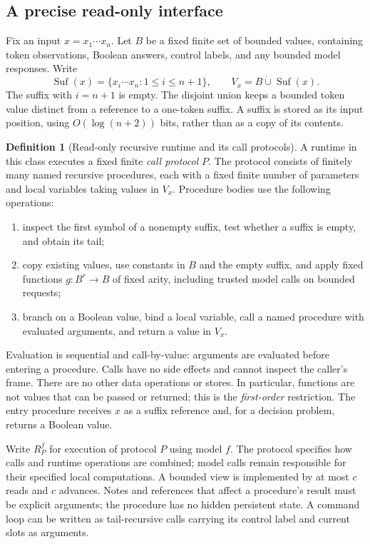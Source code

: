 \documentclass[11pt,twoside]{article}
\theoremstyle{definition}
\newtheorem{definition}[theorem]{Definition}
\theoremstyle{remark}
\begin{document}
\subsection{A precise read-only interface}

Fix an input $x=x_1\cdots x_n$. Let $B$ be a fixed finite set of bounded
values, containing token observations, Boolean answers, control labels,
and any bounded model responses. Write
\begin{equation}
 \operatorname{Suf}(x)=\{x_i\cdots x_n:1\leq i\leq n+1\},
 \qquad V_x=B\mathbin{\dot\cup}\operatorname{Suf}(x).
 \label{eq:readonly-values}
\end{equation}
The suffix with $i=n+1$ is empty. The disjoint union keeps a bounded token
value distinct from a reference to a one-token suffix. A suffix is stored
as its input position, using $O(\log(n+2))$ bits, rather than as a copy of
its contents.

\begin{definition}[Read-only recursive runtime and its call protocols]
\label{def:readonly}
A runtime in this class executes a fixed finite \emph{call protocol} $P$.
The protocol consists of finitely many named recursive procedures, each
with a fixed finite number of parameters and local variables taking values
in $V_x$. Procedure bodies use the following operations:
\begin{enumerate}[label=(\roman*),leftmargin=*]
\item inspect the first symbol of a nonempty suffix, test whether a suffix
is empty, and obtain its tail;
\item copy existing values, use constants in $B$ and the empty suffix,
and apply fixed functions $g:B^r\to B$ of fixed arity, including trusted
model calls on bounded requests;
\item branch on a Boolean value, bind a local variable, call a named
procedure with evaluated arguments, and return a value in $V_x$.
\end{enumerate}
Evaluation is sequential and call-by-value: arguments are evaluated before
entering a procedure. Calls have no side effects and cannot inspect the
caller's frame. There are no other data operations or stores. In particular,
functions are not values that can be passed or returned; this is the
\emph{first-order} restriction. The entry procedure receives $x$ as a suffix
reference and, for a decision problem, returns a Boolean value.
\end{definition}

Write $R_P^f$ for execution of protocol $P$ using model $f$. The protocol
specifies how calls and runtime operations are combined; model calls
remain responsible for their specified local computations. A bounded view
is implemented by at most $c$ reads and $c$ advances. Notes and
references that affect a procedure's result must be explicit arguments;
the procedure has no hidden persistent state. A command loop can be
written as tail-recursive calls carrying its control label and current
slots as arguments.
\end{document}
